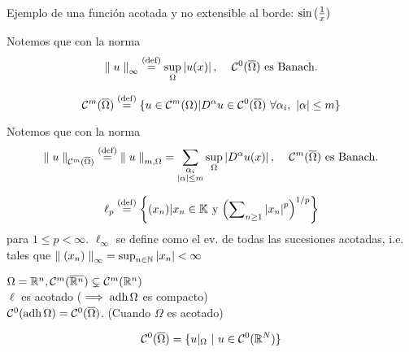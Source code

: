 Ejemplo de una función acotada y no extensible al borde: $\sin{(\inv{x})}$

Notemos que con la norma
$$\norm[\infty]{u} \defeq \sup_{\Omega} \abs{u(x)} \text{, $\quad \Cf[0]{\bOmega}$ es Banach.}$$

\begin{defn}\MarginNote{$\Cf[m]{\bOmega}$}
$$\Cf[m]{\bOmega} \defeq \{ u \in \Cf[m]{\Omega} | D^{\alpha} u \in \Cf[0]{\bOmega} \ \forall \alpha_i, \ \abs{\alpha} \leq m \}$$
\end{defn}

Notemos que con la norma
$${\parallel u \parallel}_{\Cf[m]{\bOmega}} \defeq \norm[m, \Omega]{u} = \sum_{\substack{\alpha_i \\ \abs{\alpha} \leq m}} \sup_{\Omega} \abs{D^{\alpha} u(x)} \text{, $\quad \Cf[m]{\bOmega}$ es Banach.}$$

\begin{defn}
$$\ell_{p} \defeq \left\{ 
(x_n) | x_n \in \kk \text{ y } {\left( \sum\nolimits_{n \geq 1} \abs{x_{n}}^{p} \right)}^{1/p} 
\right\}$$
para $1 \leq p < \infty$. $\ell_{\infty}$ se define como el ev. de todas las sucesiones acotadas, i.e. tales que $\norm[\infty]{(x_n)} = \sup_{n \in \nn} \abs{x_n} < \infty$
\end{defn}

\NAM{\newpage}

\begin{note}
$\Omega = \rr[n], \Cf[m]{\overline{\rr[n]}}  \subsetneq \Cf[m]{\rr[n]}$ \\
$\ell$ es acotado ($\implies \adh{\Omega}$ es compacto) \\

$\Cf[0]{\adh{\Omega}} = \Cf[0]{\bOmega}$. (Cuando $\Omega$ es acotado)
\end{note}

\begin{exer}
$$\Cf[0]{\bOmega} = \{ u|_{\Omega} \ | \ u \in \Cf[0]{\rr[N]} \}$$
\end{exer}